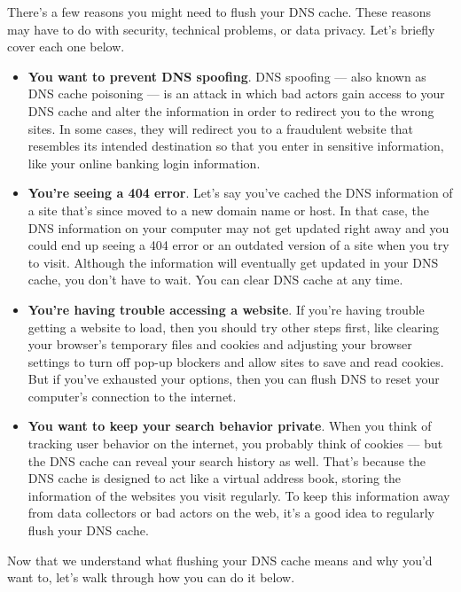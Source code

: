 \documentclass[a4paper,12pt]{book}
\begin{document}
There’s a few reasons you might need to flush your DNS cache. These reasons may have to do with security, technical problems, or data privacy. Let’s briefly cover each one below.

\begin{itemize}
\item{\textbf{You want to prevent DNS spoofing}.
DNS spoofing — also known as DNS cache poisoning — is an attack in which bad actors gain access to your DNS cache and alter the information in order to redirect you to the wrong sites. In some cases, they will redirect you to a fraudulent website that resembles its intended destination so that you enter in sensitive information, like your online banking login information.}

\item{\textbf{You’re seeing a 404 error}.
Let’s say you’ve cached the DNS information of a site that’s since moved to a new domain name or host. In that case, the DNS information on your computer may not get updated right away and you could end up seeing a 404 error or an outdated version of a site when you try to visit. Although the information will eventually get updated in your DNS cache, you don’t have to wait. You can clear DNS cache at any time.}

\item{\textbf{You’re having trouble accessing a website}.
If you’re having trouble getting a website to load, then you should try other steps first, like clearing your browser's temporary files and cookies and adjusting your browser settings to turn off pop-up blockers and allow sites to save and read cookies. But if you’ve exhausted your options, then you can flush DNS to reset your computer's connection to the internet.}

\item{\textbf{You want to keep your search behavior private}.
When you think of tracking user behavior on the internet, you probably think of cookies — but the DNS cache can reveal your search history as well. That’s because the DNS cache is designed to act like a virtual address book, storing the information of the websites you visit regularly. To keep this information away from data collectors or bad actors on the web, it’s a good idea to regularly flush your DNS cache.}
\end{itemize}
Now that we understand what flushing your DNS cache means and why you’d want to, let’s walk through how you can do it below.
\end{document}
